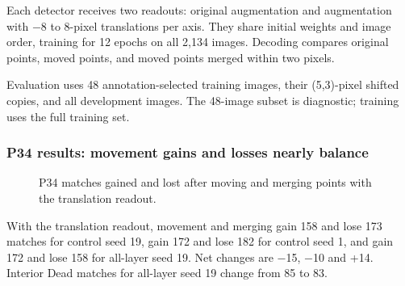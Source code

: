 \documentclass[
  12pt,
]{article}
\begin{document}
Each detector receives two readouts: original augmentation and augmentation with \ensuremath{-}8 to 8-pixel translations per axis. They share initial weights and image order, training for 12 epochs on all 2,134 images. Decoding compares original points, moved points, and moved points merged within two pixels.

\begin{center}\end{center}
Evaluation uses 48 annotation-selected training images, their (5,3)-pixel shifted copies, and all development images. The 48-image subset is diagnostic; training uses the full training set.

\subsubsection{P34 results: movement gains and losses nearly balance}\label{chapter14}
\begin{figure}[H]\centering\caption{P34 matches gained and lost after moving and merging points with the translation readout.}\end{figure}
With the translation readout, movement and merging gain 158 and lose 173 matches for control seed 19, gain 172 and lose 182 for control seed 1, and gain 172 and lose 158 for all-layer seed 19. Net changes are \ensuremath{-}15, \ensuremath{-}10 and +14. Interior Dead matches for all-layer seed 19 change from 85 to 83.
\end{document}
